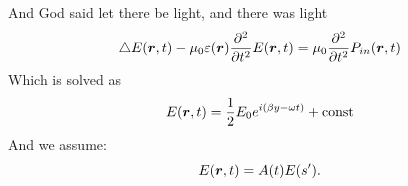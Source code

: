 And God said let there be light, and there was light
\begin{equation}
	\triangle E(\mbox{\boldmath $r$},t) - \mu_0 \varepsilon(\mbox{\boldmath $r$}) \frac{\partial^2}{\partial t^2} E(\mbox{\boldmath $r$}, t) = \mu_0 \frac{\partial^2}{\partial t^2} P_{in}(\mbox{\boldmath $r$},t)
\end{equation}
Which is solved as
\begin{equation*}
	E(\mbox{\boldmath $r$},t) = \frac{1}{2} E_0 e^{i(\beta y - \omega t)} + \text{const}
\end{equation*}
And we assume:
\begin{equation*}
	E(\mbox{\boldmath $r$}, t) = A(t) E(s').
\end{equation*}